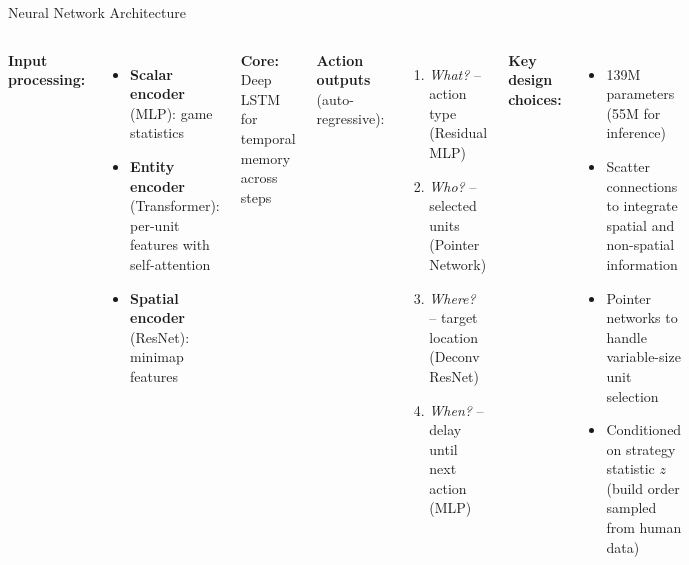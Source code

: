 \documentclass[aspectratio=169]{beamer}
\begin{document}
\begin{frame}{Neural Network Architecture}
\begin{columns}[T]
\textbf{Input processing:}
\begin{itemize}
    \item \textbf{Scalar encoder} (MLP): game statistics
    \item \textbf{Entity encoder} (Transformer): per-unit features with self-attention
    \item \textbf{Spatial encoder} (ResNet): minimap features
\end{itemize}

\vspace{0.3em}
\textbf{Core:} Deep LSTM for temporal memory across steps

\vspace{0.3em}
\textbf{Action outputs} (auto-regressive):
\begin{enumerate}
    \item \textit{What?} -- action type (Residual MLP)
    \item \textit{Who?} -- selected units (Pointer Network)
    \item \textit{Where?} -- target location (Deconv ResNet)
    \item \textit{When?} -- delay until next action (MLP)
\end{enumerate}

\textbf{Key design choices:}
\begin{itemize}
    \item 139M parameters (55M for inference)
    \item Scatter connections to integrate spatial and non-spatial information
    \item Pointer networks to handle variable-size unit selection
    \item Conditioned on strategy statistic $z$ (build order sampled from human data)
\end{itemize}
\end{columns}
\end{frame}
\end{document}
